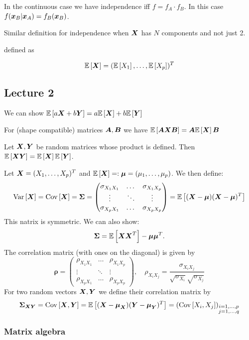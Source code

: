 In the continuous case we have independence iff $f=f_A\cdot f_B$. In this case $f(\x_B|\x_A) = f_B(\x_B)$.

Similar definition for independence when $\X$ has $N$ components and not just 2.

\textbf{}

 defined as

$$
    \ev{\X} = (\ev{X_1},\dots,\ev{X_p})^T
$$
\subsection*{Lecture 2}

We can show
$
    \ev{a \X + b \Y} = a\ev{\X}+ b \ev{\Y}
$

For (shape compatible) matrices $\mA, \mB$ we have
$
    \ev{\mA\X \mB} = \mA\ev{\X}\mB
$

Let $\X, \Y$ be random matrices whose product is defined. Then $\ev{\X\Y} = \ev{\X}\ev{\Y}$.

\textbf{}

Let $\X=(X_1,\dots,X_p)^T$ and $\ev{\X}=:\M=({\mu_1,\dots,\mu_p})$. We then define:
$$
    \var{\X} = \cov{\X} = \SS = \begin{pmatrix}
        \sigma_{X_1X_1} & \dots & \sigma_{X_1X_p} \\
        \vdots & \ddots & \vdots \\
        \sigma_{X_pX_1} & \dots & \sigma_{X_pX_p}
    \end{pmatrix}
    =\ev{(\X-\M)(\X-\M)^T}
$$
This natrix is symmetric. We can also show:
$$
    \SS = \ev{\X\X^T} - \M\M^T.
$$
The correlation matrix (with ones on the diagonal) is given by
$$
    \boldsymbol{\rho}
    =
    \begin{pmatrix}
        \rho_{X_1X_1} & \dots & \rho_{X_1X_p} \\
        \vdots & \ddots & \vdots \\
        \rho_{X_pX_1} & \dots & \rho_{X_pX_p}
    \end{pmatrix}
    ,\quad
    \rho_{X_iX_j} = \frac{\sigma_{X_iX_j}}{\sqrt{\sigma_{X_i}}\sqrt{\sigma_{X_j}}}
$$
For two random vectors $\X,\Y$ we define their correlation matrix by
$$
    \SS_{\X\Y} 
    = \cov{\X,\Y} 
    = \ev{(\X-\M_{\X})(\Y-\M_{\Y})^T}
    =(\cov{X_i,X_j})_{\substack{i=1,\dots,p \\ j= 1,\dots,q}}
$$


\subsubsection{Matrix algebra}


